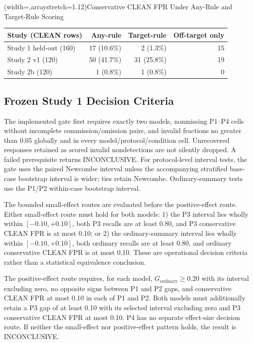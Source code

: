 \documentclass{ieeeaccess}
\newcommand{\Gordinary}{G_{\mathrm{ordinary}}}
\begin{document}
\Table[t](width=\columnwidth,arraystretch=1.12){Conservative CLEAN FPR Under Any-Rule and Target-Rule Scoring \label{tab:fpr}}{\setlength{\tabcolsep}{4pt}\begin{tabular}{@{}lrrr@{}}
\toprule
Study (CLEAN rows) & Any-rule & Target-rule & Off-target only\\
\midrule
Study 1 held-out (160) & 17 (10.6\%) & 2 (1.3\%) & 15\\
Study 2 v1 (120) & 50 (41.7\%) & 31 (25.8\%) & 19\\
Study 2b (120) & 1 (0.8\%) & 1 (0.8\%) & 0\\
\bottomrule
\end{tabular}}

\subsection{Frozen Study 1 Decision Criteria}
The implemented gate first requires exactly two models, nonmissing P1--P4 cells without incomplete commission/omission pairs, and invalid fractions no greater than 0.05 globally and in every model/protocol/condition cell. Unrecovered responses retained as scored invalid nondetections are not silently dropped. A failed prerequisite returns INCONCLUSIVE. For protocol-level interval tests, the gate uses the paired Newcombe interval unless the accompanying stratified base-case bootstrap interval is wider; ties retain Newcombe. Ordinary-summary tests use the P1/P2 within-case bootstrap interval.

The bounded small-effect routes are evaluated before the positive-effect route. Either small-effect route must hold for both models: 1) the P3 interval lies wholly within $[-0.10,+0.10]$, both P3 recalls are at least 0.80, and P3 conservative CLEAN FPR is at most 0.10; or 2) the ordinary-summary interval lies wholly within $[-0.10,+0.10]$, both ordinary recalls are at least 0.80, and ordinary conservative CLEAN FPR is at most 0.10. These are operational decision criteria rather than a statistical equivalence conclusion.

The positive-effect route requires, for each model, $\Gordinary\geq0.20$ with its interval excluding zero, no opposite signs between P1 and P2 gaps, and conservative CLEAN FPR at most 0.10 in each of P1 and P2. Both models must additionally retain a P3 gap of at least 0.10 with its selected interval excluding zero and P3 conservative CLEAN FPR at most 0.10. P4 has no separate effect-size decision route. If neither the small-effect nor positive-effect pattern holds, the result is INCONCLUSIVE.
\end{document}
